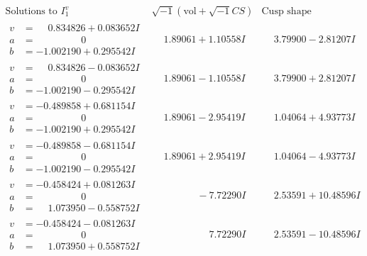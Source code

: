 \documentclass[1p]{elsarticle_modified}
\theoremstyle{definition}
\newcommand{\I}{\sqrt{-1}}
\begin{document}
$$\begin{array}{c|c|c}  
\text{Solutions to }I^v_{1}& \I (\text{vol} + \sqrt{-1}CS) & \text{Cusp shape}\\
 \hline 
\begin{aligned}
v &= \phantom{-}0.834826 + 0.083652 I \\
a &= \phantom{-0.000000 } 0 \\
b &= -1.002190 + 0.295542 I\end{aligned}
 & \phantom{-}1.89061 + 1.10558 I & \phantom{-}3.79900 - 2.81207 I \\ \hline\begin{aligned}
v &= \phantom{-}0.834826 - 0.083652 I \\
a &= \phantom{-0.000000 } 0 \\
b &= -1.002190 - 0.295542 I\end{aligned}
 & \phantom{-}1.89061 - 1.10558 I & \phantom{-}3.79900 + 2.81207 I \\ \hline\begin{aligned}
v &= -0.489858 + 0.681154 I \\
a &= \phantom{-0.000000 } 0 \\
b &= -1.002190 + 0.295542 I\end{aligned}
 & \phantom{-}1.89061 - 2.95419 I & \phantom{-}1.04064 + 4.93773 I \\ \hline\begin{aligned}
v &= -0.489858 - 0.681154 I \\
a &= \phantom{-0.000000 } 0 \\
b &= -1.002190 - 0.295542 I\end{aligned}
 & \phantom{-}1.89061 + 2.95419 I & \phantom{-}1.04064 - 4.93773 I \\ \hline\begin{aligned}
v &= -0.458424 + 0.081263 I \\
a &= \phantom{-0.000000 } 0 \\
b &= \phantom{-}1.073950 - 0.558752 I\end{aligned}
 & \phantom{-0.000000 } -7.72290 I & \phantom{-}2.53591 + 10.48596 I \\ \hline\begin{aligned}
v &= -0.458424 - 0.081263 I \\
a &= \phantom{-0.000000 } 0 \\
b &= \phantom{-}1.073950 + 0.558752 I\end{aligned}
 & \phantom{-0.000000 -}7.72290 I & \phantom{-}2.53591 - 10.48596 I \\ \hline\begin{aligned}

\end{aligned}
\end{array}$$
\end{document}
